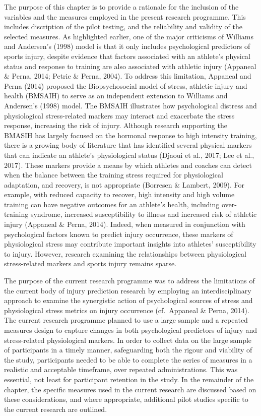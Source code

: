 \documentclass[man,floatsintext]{apa6}
\begin{document}
The purpose of this chapter is to provide a rationale for the inclusion of the variables and the measures employed in the present research programme.
This includes discription of the pilot testing, and the reliability and validity of the selected measures.
As highlighted earlier, one of the major criticisms of Williams and Andersen's (1998) model is that it only includes psychological predictors of sports injury, despite evidence that factors associated with an athlete's physical status and response to training are also associated with athletic injury (Appaneal \& Perna, 2014; Petrie \& Perna, 2004).
To address this limitation, Appaneal and Perna (2014) proposed the Biopsychosocial model of stress, athletic injury and health (BMSAIH) to serve as an independent extension to Williams and Andersen's (1998) model.
The BMSAIH illustrates how psychological distress and physiological stress-related markers may interact and exacerbate the stress response, increasing the risk of injury.
Although research supporting the BMASIH has largely focused on the hormonal response to high intensity training, there is a growing body of literature that has identified several physical markers that can indicate an athlete's physiological status (Djaoui et al., 2017; Lee et al., 2017).
These markers provide a means by which athletes and coaches can detect when the balance between the training stress required for physiological adaptation, and recovery, is not appropriate (Borresen \& Lambert, 2009).
For example, with reduced capacity to recover, high intensity and high volume training can have negative outcomes for an athlete's health, including over-training syndrome, increased susceptibility to illness and increased risk of athletic injury (Appaneal \& Perna, 2014).
Indeed, when measured in conjunction with psychological factors known to predict injury occurrence, these markers of physiological stress may contribute important insights into athletes' susceptibility to injury.
However, research examining the relationships between physiological stress-related markers and sports injury remains sparse.

The purpose of the current research programme was to address the limitations of the current body of injury prediction research by employing an interdisciplinary approach to examine the synergistic action of psychological sources of stress and physiological stress metrics on injury occurrence (cf.~Appaneal \& Perna, 2014).
The current research programme planned to use a large sample and a repeated measures design to capture changes in both psychological predictors of injury and stress-related physiological markers.
In order to collect data on the large sample of participants in a timely manner, safeguarding both the rigour and viability of the study, participants needed to be able to complete the series of measures in a realistic and acceptable timeframe, over repeated administrations.
This was essential, not least for participant retention in the study.
In the remainder of the chapter, the specific measures used in the current research are discussed based on these considerations, and where appropriate, additional pilot studies specific to the current research are outlined.
\end{document}
